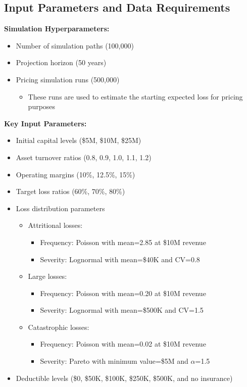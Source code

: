 \documentclass[11pt,letterpaper]{article}
\begin{document}
\subsection{Input Parameters and Data Requirements}

\textbf{Simulation Hyperparameters:}
\begin{itemize}
    \item Number of simulation paths (100,000)
    \item Projection horizon (50 years)
    \item Pricing simulation runs (500,000)
        \begin{itemize}[label=$\circ$]
            \item These runs are used to estimate the starting expected loss for pricing purposes
        \end{itemize}
\end{itemize}

\textbf{Key Input Parameters:}
\begin{itemize}
    \item Initial capital levels (\$5M, \$10M, \$25M)
    \item Asset turnover ratios (0.8, 0.9, 1.0, 1.1, 1.2)
    \item Operating margins (10\%, 12.5\%, 15\%)
    \item Target loss ratios (60\%, 70\%, 80\%)
    \item Loss distribution parameters
        \begin{itemize}[label=$\circ$]
            \item Attritional losses:
                \begin{itemize}[label=$\raisebox{.45ex}{\rule{.6ex}{.6ex}}$]
                    \item Frequency: Poisson with mean=2.85 at \$10M revenue
                    \item Severity: Lognormal with mean=\$40K and CV=0.8
                \end{itemize}
            \item Large losses:
                \begin{itemize}[label=$\raisebox{.45ex}{\rule{.6ex}{.6ex}}$]
                    \item Frequency: Poisson with mean=0.20 at \$10M revenue
                    \item Severity: Lognormal with mean=\$500K and CV=1.5
                \end{itemize}
            \item Catastrophic losses:
                \begin{itemize}[label=$\raisebox{.45ex}{\rule{.6ex}{.6ex}}$]
                    \item Frequency: Poisson with mean=0.02 at \$10M revenue
                    \item Severity: Pareto with minimum value=\$5M and $\alpha$=1.5
                \end{itemize}
        \end{itemize}
    \item Deductible levels (\$0, \$50K, \$100K, \$250K, \$500K, and no insurance)
\end{itemize}
\end{document}
